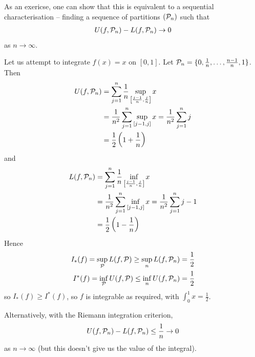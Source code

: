 \documentclass{../template/note}
\begin{document}
    \begin{remark*}
        As an exericse, one can show that this is equivalent to a sequential characterisation -- finding a sequence of partitions \((\mathcal{P}_n)\) such that
        \begin{align*}
            U(f, \mathcal{P}_n) - L(f, \mathcal{P}_n) \to 0
        \end{align*}
        as \(n \to \infty\).        
    \end{remark*}
    
    \begin{example*}
        Let us attempt to integrate \(f(x) = x\) on \([0, 1]\). Let \(\mathcal{P}_n = \{0, \frac 1 n, \dots, \frac {n-1} n, 1\}\). Then
        \begin{align*}
            U(f, \mathcal{P}_n) &= \sum_{j=1}^n \frac 1 n \sup_{\left[\frac{j-1}n, \frac jn\right]} x \\
            &= \frac 1 {n^2} \sum_{j=1}^n \sup_{[j-1, j]} x = \frac 1 {n^2} \sum_{j=1}^n j \\
            &= \frac 1 2 \left(1 + \frac 1 n\right)
        \end{align*}
        and 
        \begin{align*}
            L(f, \mathcal{P}_n) &= \sum_{j=1}^n \frac 1 n \inf_{\left[\frac{j-1}n, \frac jn\right]} x \\
            &= \frac 1 {n^2} \sum_{j=1}^n \inf_{[j-1, j]} x = \frac 1 {n^2} \sum_{j=1}^n j-1 \\
            &= \frac 1 2 \left(1 - \frac 1 n\right)
        \end{align*}
        Hence
        \begin{align*}
            I_*(f) = \sup_{\mathcal{P}}L(f, \mathcal{P}) \geq \sup_n L(f, \mathcal{P}_n) &= \frac 1 2 \\
            I^*(f) = \inf_{\mathcal{P}}U(f, \mathcal{P}) \leq \inf_n U(f, \mathcal{P}_n) &= \frac 1 2
        \end{align*}
        so \(I_*(f) \geq I^*(f)\), so \(f\) is integrable as required, with \(\int_0^1 x = \frac 1 2\).
        
        Alternatively, with the Riemann integration criterion,
        \begin{align*}
            U(f, \mathcal{P}_n) - L(f, \mathcal{P}_n) \leq \frac 1 n \to 0
        \end{align*}
        as \(n \to \infty\) (but this doesn't give us the value of the integral).
    \end{example*}
    
\end{document}
